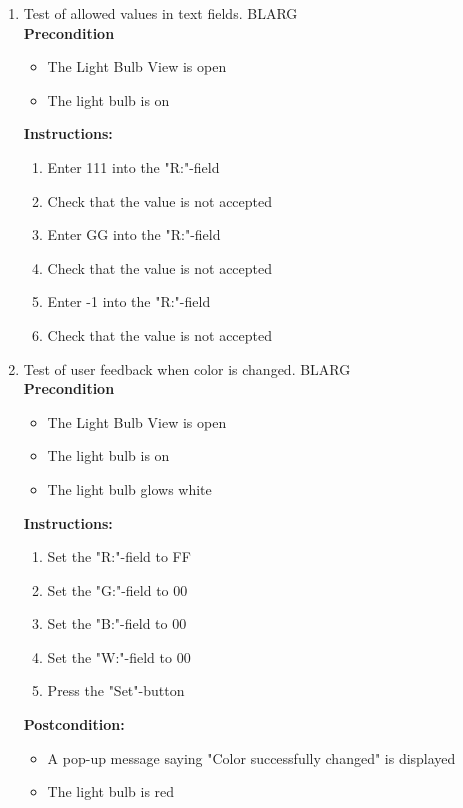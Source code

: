 \documentclass[a4paper]{article}
\newlength{\testlabellength}
\newenvironment{testlist}{\begin{enumerate}[label=\bfseries Instruction \thesubsection.\arabic* , labelindent=0pt, labelwidth=\testlabellength , leftmargin=2cm]}{\end{enumerate}}
\newenvironment{precondition}{
{\color{white}BLARG}\\ 
\textbf{Precondition}
\begin{itemize}[labelindent=0cm, labelwidth=2cm , leftmargin=1cm]
}
{\end{itemize}}
\newenvironment{instruction}{
\textbf{Instructions:}
\begin{enumerate}[label=\bfseries  \arabic*., labelindent=0cm, labelwidth=2cm , leftmargin=1cm]
}
{\end{enumerate}}
\newenvironment{postcondition}{
\textbf{Postcondition:}
\begin{itemize}[labelindent=0cm, labelwidth=2cm , leftmargin=1cm]
}
{\end{itemize}}
\begin{document}
\begin{appendices}
\begin{testlist}
	\item Test of allowed values in text fields.
		\begin{precondition}
			\item The Light Bulb View is open
			\item The light bulb is on
		\end{precondition}
		\begin{instruction}
			\item Enter 111 into the "R:"-field
			\item Check that the value is not accepted
			\item Enter GG into the "R:"-field
			\item Check that the value is not accepted
			\item Enter -1 into the "R:"-field
			\item Check that the value is not accepted
		\end{instruction}
				
	\item Test of user feedback when color is changed.
		\begin{precondition}
			\item The Light Bulb View is open
			\item The light bulb is on
			\item The light bulb glows white
		\end{precondition}
		\begin{instruction}
			\item Set the "R:"-field to FF
			\item Set the "G:"-field to 00
			\item Set the "B:"-field to 00
			\item Set the "W:"-field to 00
			\item Press the "Set"-button
		\end{instruction}
		\begin{postcondition}
			\item A pop-up message saying "Color successfully changed" is displayed
			\item The light bulb is red
		\end{postcondition}


\end{testlist}
\end{appendices}
\end{document}
